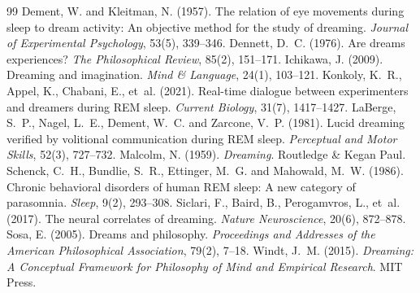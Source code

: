 \documentclass{situationist-preprint}
\begin{document}
\begin{thebibliography}{99}\small
{} Dement, W. and Kleitman, N. (1957). The relation of eye movements during sleep to dream activity: An objective method for the study of dreaming. \emph{Journal of Experimental Psychology}, 53(5), 339--346.
 Dennett, D.~C. (1976). Are dreams experiences? \emph{The Philosophical Review}, 85(2), 151--171.
 Ichikawa, J. (2009). Dreaming and imagination. \emph{Mind \& Language}, 24(1), 103--121.
 Konkoly, K.~R., Appel, K., Chabani, E., et~al. (2021). Real-time dialogue between experimenters and dreamers during REM sleep. \emph{Current Biology}, 31(7), 1417--1427.
 LaBerge, S.~P., Nagel, L.~E., Dement, W.~C. and Zarcone, V.~P. (1981). Lucid dreaming verified by volitional communication during REM sleep. \emph{Perceptual and Motor Skills}, 52(3), 727--732.
 Malcolm, N. (1959). \emph{Dreaming}. Routledge \& Kegan Paul.
 Schenck, C.~H., Bundlie, S.~R., Ettinger, M.~G. and Mahowald, M.~W. (1986). Chronic behavioral disorders of human REM sleep: A new category of parasomnia. \emph{Sleep}, 9(2), 293--308.
 Siclari, F., Baird, B., Perogamvros, L., et~al. (2017). The neural correlates of dreaming. \emph{Nature Neuroscience}, 20(6), 872--878.
 Sosa, E. (2005). Dreams and philosophy. \emph{Proceedings and Addresses of the American Philosophical Association}, 79(2), 7--18.
 Windt, J.~M. (2015). \emph{Dreaming: A Conceptual Framework for Philosophy of Mind and Empirical Research}. MIT Press.
\end{thebibliography}
\end{document}
